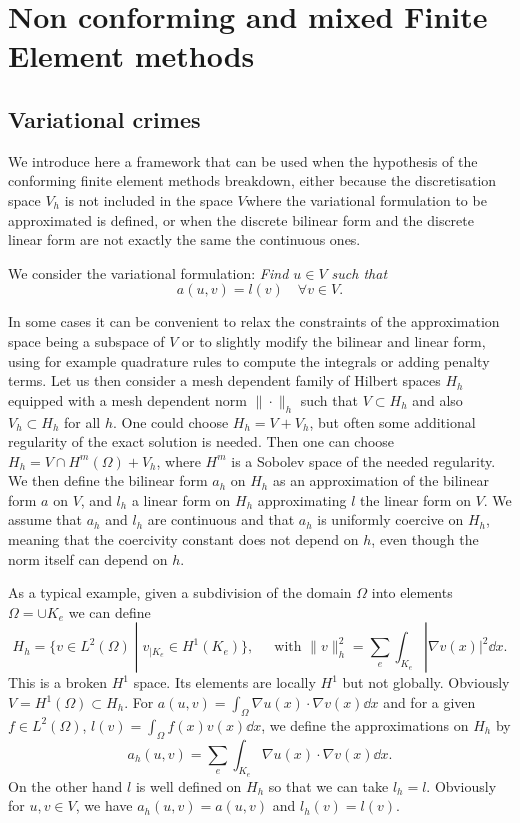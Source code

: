 \chapter{Non conforming and mixed Finite Element methods}

\section{Variational crimes}

We introduce here a framework that can be used when the hypothesis of the conforming finite element methods breakdown, either because the discretisation space $V_h$ is not included in the space  $V$where the variational formulation to be approximated is defined, or when the discrete bilinear form and the discrete linear form are not exactly the same the continuous ones.


We  consider the variational formulation: \emph{Find $u\in V$ such that}
\begin{equation}\label{eq:cont_non_conf}
 a(u,v) = l(v)\quad\forall v\in V.
 \end{equation}

In some cases it can be convenient to relax the constraints of the approximation space being a subspace of $V$ or to slightly modify the bilinear and linear form, using for example quadrature rules to compute the integrals or adding penalty terms. Let us then consider a mesh dependent family of Hilbert spaces $H_h$ equipped with a mesh dependent norm $\|\cdot\|_h$ such that $V \subset H_h$ and also $V_h\subset H_h$ for all $h$. One could choose $H_h=V+V_h$, but often some additional regularity of the exact solution is needed. Then one can choose $H_h=V\cap H^m(\Omega)+V_h$, where $H^m$ is a Sobolev space of the needed regularity.
  We then define the bilinear form $a_h$ on $H_h$ as an approximation of the bilinear form $a$ on $V$, and 
$l_h$ a linear form on $H_h$ approximating $l$ the linear form on $V$. We assume that $a_h$ and $l_h$ are continuous and that $a_h$ is uniformly coercive on $H_h$, meaning that the coercivity constant does not depend on $h$, even though the norm itself can depend on $h$.

As a typical example, given a subdivision of the domain $\Omega$ into elements
$\Omega = \cup K_e$ we can define 
$$H_h=\{ v \in L^2(\Omega) \;|\; v_{|K_e}\in H^1(K_e)\}, ~~~~~\mbox{ with } \|v\|_h^2 = \sum_{e}  \int_{K_e} |\nabla v(x)|^2 \dd x.$$
This is a broken $H^1$ space. Its elements are locally $H^1$ but not globally. Obviously $ V=H^1(\Omega)\subset H_h$. For $a(u,v)= \int_\Omega \nabla u(x) \cdot \nabla v(x) \dd x$ and  for a given $f\in L^2(\Omega)$,
$l(v) = \int_\Omega f(x)v(x) \dd x$, we define the approximations on $H_h$ by
$$a_h(u,v) = \sum_{e}  \int_{K_e} \nabla u(x)\cdot \nabla v(x) \dd x.$$
On the other hand $l$ is well defined on $H_h$ so that we can take $l_h=l$.
Obviously for $u,v\in V$, we have $a_h(u,v)=a(u,v)$ and $l_h(v)=l(v)$.

